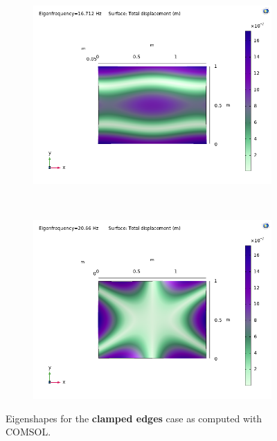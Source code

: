 \documentclass[a4paper]{article}
\begin{document}
\begin{figure}[h]
	\begin{subfigure}[b]{0.31\linewidth}
		\includegraphics[width=0.9\linewidth]{comsol/4f.png}
	\end{subfigure}
	~
	\begin{subfigure}[b]{0.31\linewidth}
		\includegraphics[width=0.9\linewidth]{comsol/5f.png}
	\end{subfigure}
	\caption{Eigenshapes for the \textbf{clamped edges} case as computed with COMSOL.}
	\label{fig:c_com}
\end{figure}
\end{document}
